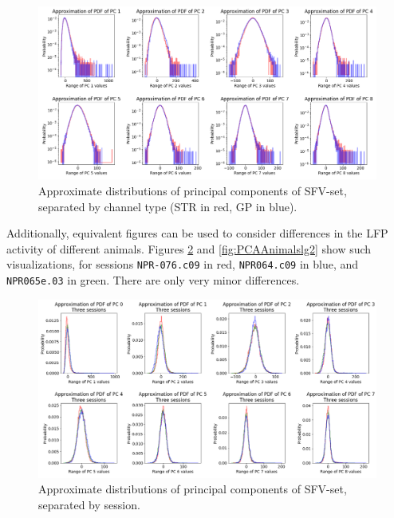 \documentclass{kththesis}
\begin{document}
\begin{figure}[H]
    \centering
    \centerline{\includegraphics[width=1.3\textwidth]{images/PCA/PCABOTHLG2.png}}
    \caption{Approximate distributions of principal components of SFV-set, separated by channel type (STR in red, GP in blue).}
    \label{fig:PCAPDFBOTHLG2}
\end{figure}

Additionally, equivalent figures can be used to consider differences in the LFP activity of different animals.
Figures \ref{fig:PCAAnimals} and \ref{fig:PCAAnimalslg2} show such visualizations, for sessions \texttt{NPR-076.c09} in red, \texttt{NPR064.c09} in blue, and \texttt{NPR065e.03} in green.
There are only very minor differences.

\begin{figure}[H]
    \centering
    \centerline{\includegraphics[width=1.2\textwidth]{images/PCA/PCAAnimalsnormal.png}}
    \caption{Approximate distributions of principal components of SFV-set, separated by session.}
    \label{fig:PCAAnimals}
\end{figure}
\end{document}
